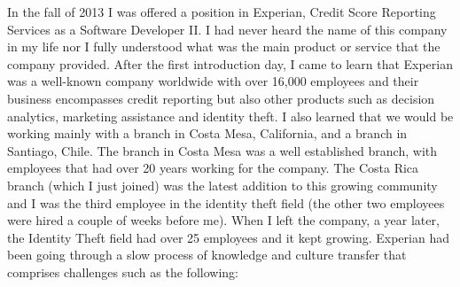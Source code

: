 \documentclass[12pt, letterpaper]{article}
\begin{document}
In the fall of 2013 I was offered a position in Experian, Credit Score Reporting Services as a Software Developer II.
I had never heard the name of this company in my life nor I fully understood what was the main product or service that 
the company provided. 
After the first introduction day, I came to learn that Experian was a well-known company worldwide with over 16,000
employees and their business encompasses credit reporting but also other products such as decision 
analytics, marketing assistance and identity theft. I also learned that we would be working mainly with a branch in 
Costa Mesa, California, and a branch in Santiago, Chile. The branch in Costa Mesa was a well established branch, with 
employees that had over 20 years working for the company. The Costa Rica branch (which I just joined) was the 
latest addition to this growing 
community and I was the third employee in the identity theft field (the other two employees were hired a couple of 
weeks before me). When I left the company, a year later, the Identity Theft field had  over 25 employees and it 
kept growing. Experian had been going through a slow process of knowledge and culture transfer that comprises 
challenges such as the following:
\end{document}

